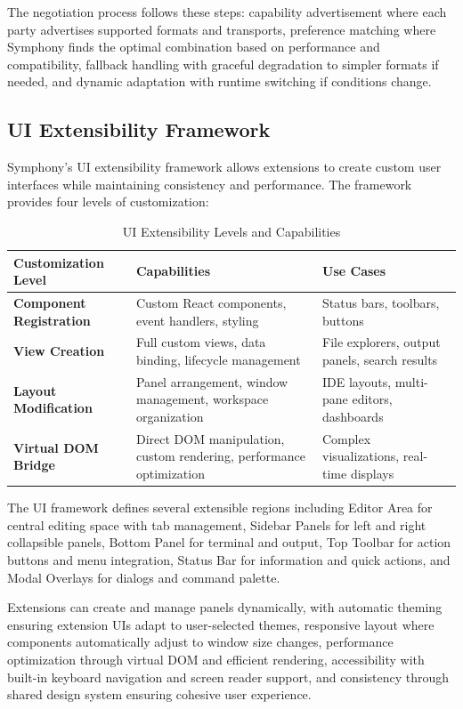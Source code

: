 The negotiation process follows these steps: capability advertisement where each party advertises supported formats and transports, preference matching where Symphony finds the optimal combination based on performance and compatibility, fallback handling with graceful degradation to simpler formats if needed, and dynamic adaptation with runtime switching if conditions change.

\subsection*{UI Extensibility Framework}

Symphony's UI extensibility framework allows extensions to create custom user interfaces while maintaining consistency and performance. The framework provides four levels of customization:

\begin{table}[H]
\caption{UI Extensibility Levels and Capabilities}
\centering
\begin{tabular}{@{}p{}p{}p{}@{}}
\toprule
\textbf{Customization Level} & \textbf{Capabilities} & \textbf{Use Cases} \\
\midrule
\textbf{Component Registration} & 
Custom React components, event handlers, styling & 
Status bars, toolbars, buttons \\
\midrule
\textbf{View Creation} & 
Full custom views, data binding, lifecycle management & 
File explorers, output panels, search results \\
\midrule
\textbf{Layout Modification} & 
Panel arrangement, window management, workspace organization & 
IDE layouts, multi-pane editors, dashboards \\
\midrule
\textbf{Virtual DOM Bridge} & 
Direct DOM manipulation, custom rendering, performance optimization & 
Complex visualizations, real-time displays \\
\bottomrule
\end{tabular}
\end{table}

The UI framework defines several extensible regions including Editor Area for central editing space with tab management, Sidebar Panels for left and right collapsible panels, Bottom Panel for terminal and output, Top Toolbar for action buttons and menu integration, Status Bar for information and quick actions, and Modal Overlays for dialogs and command palette.

Extensions can create and manage panels dynamically, with automatic theming ensuring extension UIs adapt to user-selected themes, responsive layout where components automatically adjust to window size changes, performance optimization through virtual DOM and efficient rendering, accessibility with built-in keyboard navigation and screen reader support, and consistency through shared design system ensuring cohesive user experience.

